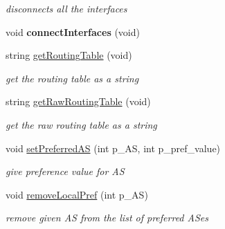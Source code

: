 \begin{DoxyCompactItemize}
\begin{DoxyCompactList}\small\item\em disconnects all the interfaces \end{DoxyCompactList}\item 
\hypertarget{classRouter_aaafae7a061d23b34668e4bcd2d6c09fa}{void {\bfseries connect\-Interfaces} (void)}\label{classRouter_aaafae7a061d23b34668e4bcd2d6c09fa}

\item 
\hypertarget{classRouter_a88a647aff2e6e2f27c1a905a3e514b08}{string \hyperlink{classRouter_a88a647aff2e6e2f27c1a905a3e514b08}{get\-Routing\-Table} (void)}\label{classRouter_a88a647aff2e6e2f27c1a905a3e514b08}

\begin{DoxyCompactList}\small\item\em get the routing table as a string \end{DoxyCompactList}\item 
\hypertarget{classRouter_a93327fb1efd8d25e2f71c3761d9f77e9}{string \hyperlink{classRouter_a93327fb1efd8d25e2f71c3761d9f77e9}{get\-Raw\-Routing\-Table} (void)}\label{classRouter_a93327fb1efd8d25e2f71c3761d9f77e9}

\begin{DoxyCompactList}\small\item\em get the raw routing table as a string \end{DoxyCompactList}\item 
\hypertarget{classRouter_a8d4f91c2cf123344658ecce29c48fc03}{void \hyperlink{classRouter_a8d4f91c2cf123344658ecce29c48fc03}{set\-Preferred\-A\-S} (int p\-\_\-\-A\-S, int p\-\_\-pref\-\_\-value)}\label{classRouter_a8d4f91c2cf123344658ecce29c48fc03}

\begin{DoxyCompactList}\small\item\em give preference value for A\-S \end{DoxyCompactList}\item 
\hypertarget{classRouter_a0099c9da9f1a15f2b09b802a821fa28a}{void \hyperlink{classRouter_a0099c9da9f1a15f2b09b802a821fa28a}{remove\-Local\-Pref} (int p\-\_\-\-A\-S)}\label{classRouter_a0099c9da9f1a15f2b09b802a821fa28a}

\begin{DoxyCompactList}\small\item\em remove given A\-S from the list of preferred A\-Ses \end{DoxyCompactList}\end{DoxyCompactItemize}
